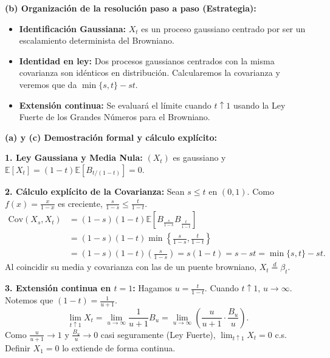\documentclass[11pt, letterpaper]{article}
\begin{document}
\begin{solucion}
    \textbf{(b) Organización de la resolución paso a paso (Estrategia):}
    \begin{itemize}
        \item[(i)] \textbf{Identificación Gaussiana:} $X_t$ es un proceso gaussiano centrado por ser un escalamiento determinista del Browniano.
        \item[(ii)] \textbf{Identidad en ley:} Dos procesos gaussianos centrados con la misma covarianza son idénticos en distribución. Calcularemos la covarianza y veremos que da $\min\{s, t\} - st$.
        \item[(iii)] \textbf{Extensión continua:} Se evaluará el límite cuando $t \uparrow 1$ usando la Ley Fuerte de los Grandes Números para el Browniano.
    \end{itemize}

    \textbf{(a) y (c) Demostración formal y cálculo explícito:}

    \textbf{1. Ley Gaussiana y Media Nula:}
    $(X_t)$ es gaussiano y $\mathbb{E}[X_t] = (1-t)\mathbb{E}[B_{t/(1-t)}] = 0$.

    \textbf{2. Cálculo explícito de la Covarianza:}
    Sean $s \le t$ en $(0,1)$. Como $f(x) = \frac{x}{1-x}$ es creciente, $\frac{s}{1-s} \le \frac{t}{1-t}$.
    \begin{align*}
        \text{Cov}(X_s, X_t) &= (1-s)(1-t) \mathbb{E}\left[ B_{\frac{s}{1-s}} B_{\frac{t}{1-t}} \right] \\
        &= (1-s)(1-t) \min\left\{\frac{s}{1-s}, \frac{t}{1-t}\right\} \\
        &= (1-s)(1-t) \left( \frac{s}{1-s} \right) = s(1-t) = s - st = \min\{s, t\} - st.
    \end{align*}
    Al coincidir su media y covarianza con las de un puente browniano, $X_t \stackrel{d}{=} \beta_t$.

    \textbf{3. Extensión continua en $t=1$:}
    Hagamos $u = \frac{t}{1-t}$. Cuando $t \uparrow 1$, $u \to \infty$. Notemos que $(1-t) = \frac{1}{u+1}$.
    \[ \lim_{t \uparrow 1} X_t = \lim_{u \to \infty} \frac{1}{u+1} B_u = \lim_{u \to \infty} \left( \frac{u}{u+1} \cdot \frac{B_u}{u} \right). \]
    Como $\frac{u}{u+1} \to 1$ y $\frac{B_u}{u} \to 0$ casi seguramente (Ley Fuerte), $\lim_{t \uparrow 1} X_t = 0$ c.s. Definir $X_1 = 0$ lo extiende de forma continua.
\end{solucion}

\newpage
\end{document}
